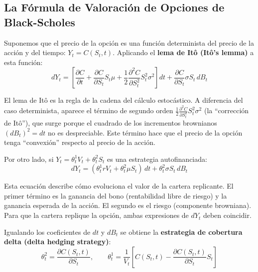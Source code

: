 \documentclass[12pt]{article}
\begin{document}
\subsection{La F\'ormula de Valoraci\'on de Opciones de Black-Scholes}

Suponemos que el precio de la opci\'on es una funci\'on determinista del precio de la acci\'on y del tiempo: $Y_t = C(S_t, t)$. Aplicando el \textbf{lema de It\^o (It\^o's lemma)} a esta funci\'on:
\begin{equation}
  dY_t = \left[\frac{\partial C}{\partial t} + \frac{\partial C}{\partial S_t} S_t \mu + \frac{1}{2}\frac{\partial^2 C}{\partial S_t^2} S_t^2 \sigma^2\right]dt + \frac{\partial C}{\partial S_t}\sigma S_t \, dB_t
\end{equation}

\begin{intuicionmat}
El lema de It\^o es la regla de la cadena del c\'alculo estoc\'astico. A diferencia del caso determinista, aparece el t\'ermino de segundo orden $\frac{1}{2}\frac{\partial^2 C}{\partial S_t^2} S_t^2 \sigma^2$ (la ``correcci\'on de It\^o''), que surge porque el cuadrado de los incrementos brownianos $(dB_t)^2 = dt$ no es despreciable. Este t\'ermino hace que el precio de la opci\'on tenga ``convexi\'on'' respecto al precio de la acci\'on.
\end{intuicionmat}

Por otro lado, si $Y_t = \theta_t^1 V_t + \theta_t^2 S_t$ es una estrategia autofinanciada:
\begin{equation}
  dY_t = (\theta_t^1 r V_t + \theta_t^2 \mu S_t)\,dt + \theta_t^2 \sigma S_t \, dB_t
\end{equation}

\begin{intuicionmat}
Esta ecuaci\'on describe c\'omo evoluciona el valor de la cartera replicante. El primer t\'ermino es la ganancia del bono (rentabilidad libre de riesgo) y la ganancia esperada de la acci\'on. El segundo es el riesgo (componente browniana). Para que la cartera replique la opci\'on, ambas expresiones de $dY_t$ deben coincidir.
\end{intuicionmat}

Igualando los coeficientes de $dt$ y $dB_t$ se obtiene la \textbf{estrategia de cobertura delta (delta hedging strategy)}:
\begin{equation}
  \theta_t^2 = \frac{\partial C(S_t, t)}{\partial S_t}, \qquad \theta_t^1 = \frac{1}{V_t}\left[C(S_t, t) - \frac{\partial C(S_t, t)}{\partial S_t} S_t\right]
\end{equation}
\end{document}
